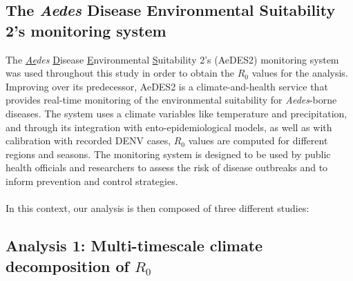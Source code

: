 \documentclass[10pt,twocolumn]{wlscirep}
\begin{document}
\subsection{The \textit{Aedes} Disease Environmental Suitability 2's monitoring system} \label{sec-methods-aedes2}

The \textit{\underline{Ae}des} \underline{D}isease \underline{E}nvironmental \underline{S}uitability 2's (AeDES2) monitoring system\cite{guerra_2025} was used throughout this study in order to obtain the $R_0$ values for the analysis. Improving over its predecessor\cite{munoz_2020b}, AeDES2 is a climate-and-health service that provides real-time monitoring of the environmental suitability for \textit{Aedes}-borne diseases. The system uses a climate variables like temperature and precipitation, and through its integration with ento-epidemiological models, as well as with calibration with recorded DENV cases, $R_0$ values are computed for different regions and seasons. The monitoring system is designed to be used by public health officials and researchers to assess the risk of disease outbreaks and to inform prevention and control strategies.
\\
\\
In this context, our analysis is then composed of three different studies:

\subsection{Analysis 1: Multi-timescale climate decomposition of $R_0$} \label{sec-methods-1-analysis}
\end{document}
